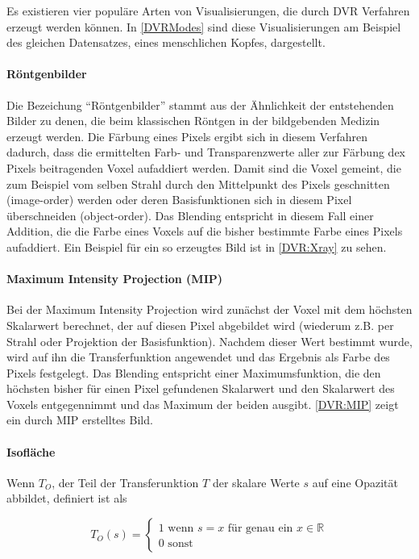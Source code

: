 \documentclass[a4paper,fontsize=12pt,toc=bib,halfparskip,ngerman]{scrartcl}
\begin{document}
Es existieren vier popul\"are Arten von Visualisierungen, die durch DVR Verfahren erzeugt werden k\"onnen. In \cref{DVRModes} sind diese Visualisierungen am Beispiel des gleichen Datensatzes, eines menschlichen Kopfes, dargestellt.

\paragraph{R\"ontgenbilder}
Die Bezeichung ``R\"ontgenbilder'' stammt aus der \"Ahnlichkeit der entstehenden Bilder zu denen, die beim klassischen R\"ontgen in der bildgebenden Medizin erzeugt werden. Die F\"arbung eines Pixels ergibt sich in diesem Verfahren dadurch, dass die ermittelten Farb- und Transparenzwerte aller zur F\"arbung dex Pixels beitragenden Voxel aufaddiert werden. Damit sind die Voxel gemeint, die zum Beispiel vom selben Strahl durch den Mittelpunkt des Pixels geschnitten (image-order) werden oder deren Basisfunktionen sich in diesem Pixel \"uberschneiden (object-order). Das Blending entspricht in diesem Fall einer Addition, die die Farbe eines Voxels auf die bisher bestimmte Farbe eines Pixels aufaddiert. Ein Beispiel f\"ur ein so erzeugtes Bild ist in \cref{DVR:Xray} zu sehen. 

\paragraph{Maximum Intensity Projection (MIP)}
Bei der Maximum Intensity Projection wird zun\"achst der Voxel mit dem h\"ochsten Skalarwert berechnet, der auf diesen Pixel abgebildet wird (wiederum z.B. per Strahl oder Projektion der Basisfunktion). Nachdem dieser Wert bestimmt wurde, wird auf ihn die Transferfunktion angewendet und das Ergebnis als Farbe des Pixels festgelegt. Das Blending entspricht einer Maximumsfunktion, die den h\"ochsten bisher f\"ur einen Pixel gefundenen Skalarwert und den Skalarwert des Voxels entgegennimmt und das Maximum der beiden ausgibt. \cref{DVR:MIP} zeigt ein durch MIP erstelltes Bild. 


\paragraph{Isofl\"ache}
Wenn $T_O$, der Teil der Transferunktion $T$ der skalare Werte $s$ auf eine Opazit\"at abbildet, definiert ist als

\begin{equation}
T_O(s) = 
\begin{cases}
1\text{ wenn $s=x$ f\"ur genau ein $x \in \mathbb{R}$}\\
0\text{ sonst}
\end{cases}
\end{equation}
\end{document}
